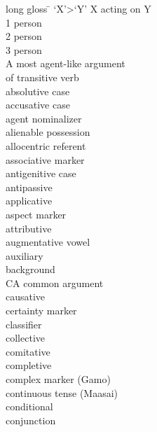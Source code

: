 
\begin{multicols}{2}
\begin{tabbing}
long gloss \= \kill
`X'>`Y' \> X acting on Y\\
1  person \\
2  person \\
3  person \\
A \> most agent-like argument\\ \>  of transitive verb\\
\abs \> absolutive case\\
{\acc} \> accusative case\\
\agnm \> agent nominalizer\\
\ali{} \> alienable possession\\
\allo{} \> allocentric referent\\
\am{} \> associative marker\\
\antgen \> antigenitive case\\
\antip{} \> antipassive\\
\appl{} \> applicative\\
\asp{} \> aspect marker\\
\att{} \> attributive\\
\augv{} \> augmentative vowel\\
\aux{} \> auxiliary\\
\bg{} \> background\\
CA \> common argument\\
\caus{} \> causative\\
\cert{} \> certainty marker\\
\clf{} \> classifier\\
\coll{} \> collective\\
\com{} \> comitative\\
\compl{} \> completive\\
\complx{} \> complex marker (Gamo)\\
\con{} \> continuous tense (Maasai)\\
\cond{} \> conditional\\
\conj{} \> conjunction\\

\end{tabbing}
\end{multicols}
